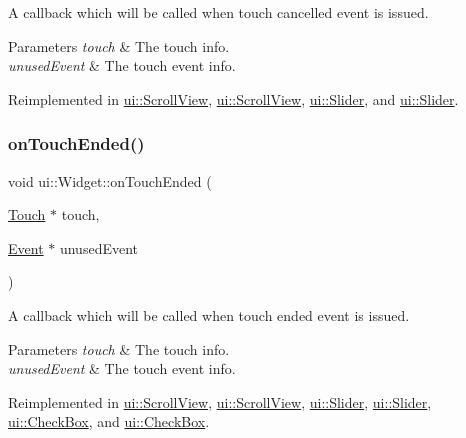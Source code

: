A callback which will be called when touch cancelled event is issued. 
\begin{DoxyParams}{Parameters}
{\em touch} & The touch info. \\
\hline
{\em unused\+Event} & The touch event info. \\
\hline
\end{DoxyParams}


Reimplemented in \hyperlink{classui_1_1ScrollView_aacfac8af19ae8315530e969897d1217a}{ui\+::\+Scroll\+View}, \hyperlink{classui_1_1ScrollView_ab1dd25cb7c32f13d8920b796986f1fea}{ui\+::\+Scroll\+View}, \hyperlink{classui_1_1Slider_aa8d68a645ef6e82eb6c48214bd5d8001}{ui\+::\+Slider}, and \hyperlink{classui_1_1Slider_aefedbd6e07e51892ed7d82489d600658}{ui\+::\+Slider}.

\mbox{\label{classui_1_1Widget_ac4d1576dfe1f3cf0a509f2d2ca0c5b90}} 
\subsubsection{\texorpdfstring{on\+Touch\+Ended()}{onTouchEnded()}\hspace{0.1cm}{\footnotesize\ttfamily [1/2]}}
{\footnotesize\ttfamily void ui\+::\+Widget\+::on\+Touch\+Ended (\begin{DoxyParamCaption}\item[{\hyperlink{classTouch}{Touch} $\ast$}]{touch,  }\item[{\hyperlink{classEvent}{Event} $\ast$}]{unused\+Event }\end{DoxyParamCaption})\hspace{0.3cm}{\ttfamily [virtual]}}

A callback which will be called when touch ended event is issued. 
\begin{DoxyParams}{Parameters}
{\em touch} & The touch info. \\
\hline
{\em unused\+Event} & The touch event info. \\
\hline
\end{DoxyParams}


Reimplemented in \hyperlink{classui_1_1ScrollView_a3bb1022184ffae6a9fc2e4f0668cddab}{ui\+::\+Scroll\+View}, \hyperlink{classui_1_1ScrollView_a74f857678194c7be230c7f66306ad5c6}{ui\+::\+Scroll\+View}, \hyperlink{classui_1_1Slider_a4729193d3c8dd8d1426f97a4ec13869e}{ui\+::\+Slider}, \hyperlink{classui_1_1Slider_afeaab747b9a9b3a71ebc77ff21e86008}{ui\+::\+Slider}, \hyperlink{classui_1_1CheckBox_a52c24b8aef0e2ea66f5220f49a95f510}{ui\+::\+Check\+Box}, and \hyperlink{classui_1_1CheckBox_a95506c0d1b1bcab1b258ed62d4cc718a}{ui\+::\+Check\+Box}.

